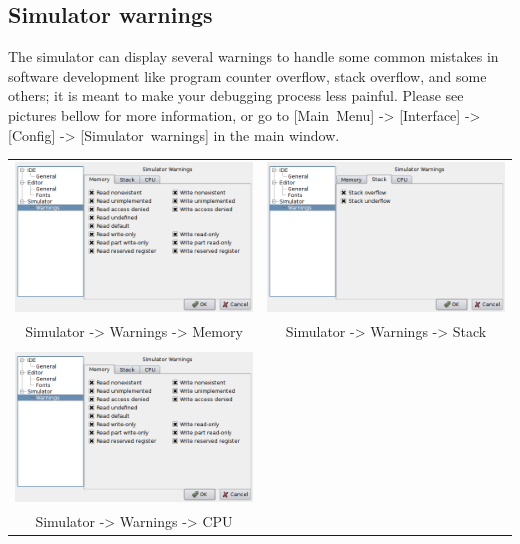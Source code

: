    \subsection{Simulator warnings}
        The simulator can display several warnings to handle some common mistakes in software development like program counter overflow, stack overflow, and some others; it is meant to make your debugging process less painful. Please see pictures bellow for more information, or go to
        [Main~Menu] -> [Interface] -> [Config] -> [Simulator~warnings] in the main window.

        \begin{table}[h!]
            \begin{tabular}{cc}
                \includegraphics[width=.45\textwidth]{img/interface4.png}
                    &
                \includegraphics[width=.45\textwidth]{img/interface5.png}
                \\ Simulator -> Warnings -> Memory & Simulator -> Warnings -> Stack
                \\
                \\ \includegraphics[width=.5\textwidth]{img/interface4.png}
                \\ Simulator -> Warnings -> CPU
            \end{tabular}
        \end{table}

